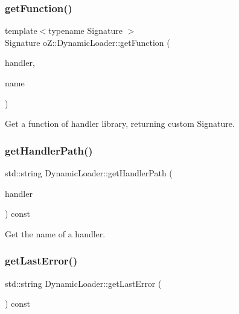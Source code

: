 \subsubsection{\texorpdfstring{getFunction()}{getFunction()}\hspace{0.1cm}{\footnotesize\ttfamily [2/2]}}
{\footnotesize\ttfamily template$<$typename Signature $>$ \\
Signature o\+Z\+::\+Dynamic\+Loader\+::get\+Function (\begin{DoxyParamCaption}\item[{\mbox{\hyperlink{namespaceo_z_acbfabf71824b5fc6a3beb64e397afc19}{Dynamic\+Handler}}}]{handler,  }\item[{const std\+::string \&}]{name }\end{DoxyParamCaption})\hspace{0.3cm}{\ttfamily [inline]}}



Get a function of handler library, returning custom Signature. 

\mbox{\label{classo_z_1_1_dynamic_loader_a732fb1a8c82a4caa1a5e3a227b9d32ab}} 
\subsubsection{\texorpdfstring{getHandlerPath()}{getHandlerPath()}}
{\footnotesize\ttfamily std\+::string Dynamic\+Loader\+::get\+Handler\+Path (\begin{DoxyParamCaption}\item[{const \mbox{\hyperlink{namespaceo_z_acbfabf71824b5fc6a3beb64e397afc19}{Dynamic\+Handler}}}]{handler }\end{DoxyParamCaption}) const\hspace{0.3cm}{\ttfamily [noexcept]}}



Get the name of a handler. 

\mbox{\label{classo_z_1_1_dynamic_loader_ae822f62c912bfdc978188d22e45798ff}} 
\subsubsection{\texorpdfstring{getLastError()}{getLastError()}}
{\footnotesize\ttfamily std\+::string Dynamic\+Loader\+::get\+Last\+Error (\begin{DoxyParamCaption}\item[{void}]{ }\end{DoxyParamCaption}) const\hspace{0.3cm}{\ttfamily [noexcept]}}



